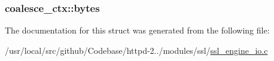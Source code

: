 \subsubsection[{\texorpdfstring{bytes}{bytes}}]{ coalesce\+\_\+ctx\+::bytes}\hypertarget{structcoalesce__ctx_a69bb4d700d12cf1b91f3c9070e2e2aea}{}\label{structcoalesce__ctx_a69bb4d700d12cf1b91f3c9070e2e2aea}


The documentation for this struct was generated from the following file\+:\begin{DoxyCompactItemize}
\item 
/usr/local/src/github/\+Codebase/httpd-\/2../modules/ssl/\hyperlink{ssl__engine__io_8c}{ssl\+\_\+engine\+\_\+io.\+c}\end{DoxyCompactItemize}
